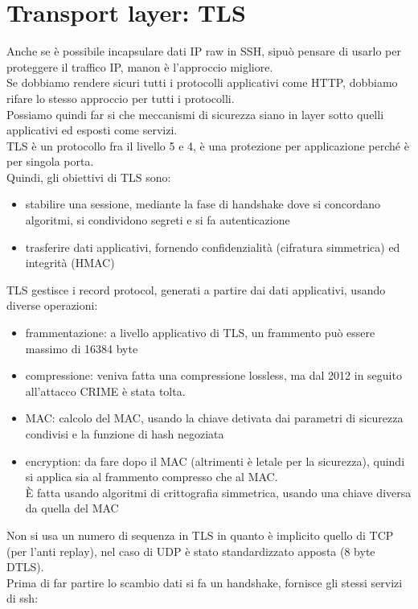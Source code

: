 \documentclass[12pt, oneside]{extbook} %
\begin{document}
\section{Transport layer: TLS}
Anche se è possibile incapsulare dati IP raw in SSH, sipuò pensare di usarlo per proteggere il traffico IP, manon è l'approccio migliore.
\\Se dobbiamo rendere sicuri tutti i protocolli applicativi come HTTP, dobbiamo rifare lo stesso approccio per tutti i protocolli.
\\Possiamo quindi far si che meccanismi di sicurezza siano in layer sotto quelli applicativi ed esposti come servizi.
\\TLS è un protocollo fra il livello 5 e 4, è una protezione per applicazione perché è per singola porta.
\\Quindi, gli obiettivi di TLS sono:
\begin{itemize}
    \item stabilire una sessione, mediante la fase di handshake dove si concordano algoritmi, si condividono segreti e si fa autenticazione
    \item trasferire dati applicativi, fornendo confidenzialità (cifratura simmetrica) ed integrità (HMAC) 
\end{itemize}
TLS gestisce i record protocol, generati a partire dai dati applicativi, usando diverse operazioni:
\begin{itemize}
    \item frammentazione: a livello applicativo di TLS, un frammento può essere massimo di 16384 byte
    \item compressione: veniva fatta una compressione lossless, ma dal 2012 in seguito all'attacco CRIME è stata tolta.
    \item MAC: calcolo del MAC, usando la chiave detivata dai parametri di sicurezza condivisi e la funzione di hash negoziata
    \item encryption: da fare dopo il MAC (altrimenti è letale per la sicurezza), quindi si applica sia al frammento compresso che al MAC.
    \\È fatta usando algoritmi di crittografia simmetrica, usando una chiave diversa da quella del MAC
\end{itemize}
Non si usa un numero di sequenza in TLS in quanto è implicito quello di TCP (per l'anti replay), nel caso di UDP è stato standardizzato apposta (8 byte DTLS).
\\Prima di far partire lo scambio dati si fa un handshake, fornisce gli stessi servizi di ssh:\\
\end{document}
